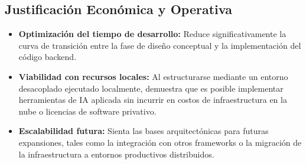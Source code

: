 \subsection{Justificación Económica y Operativa}
\begin{itemize}
    \item \textbf{Optimización del tiempo de desarrollo:} Reduce significativamente la curva de transición entre la fase de diseño conceptual y la implementación del código backend.
    \item \textbf{Viabilidad con recursos locales:} Al estructurarse mediante un entorno desacoplado ejecutado localmente, demuestra que es posible implementar herramientas de IA aplicada sin incurrir en costos de infraestructura en la nube o licencias de software privativo.
    \item \textbf{Escalabilidad futura:} Sienta las bases arquitectónicas para futuras expansiones, tales como la integración con otros frameworks o la migración de la infraestructura a entornos productivos distribuidos.
\end{itemize}